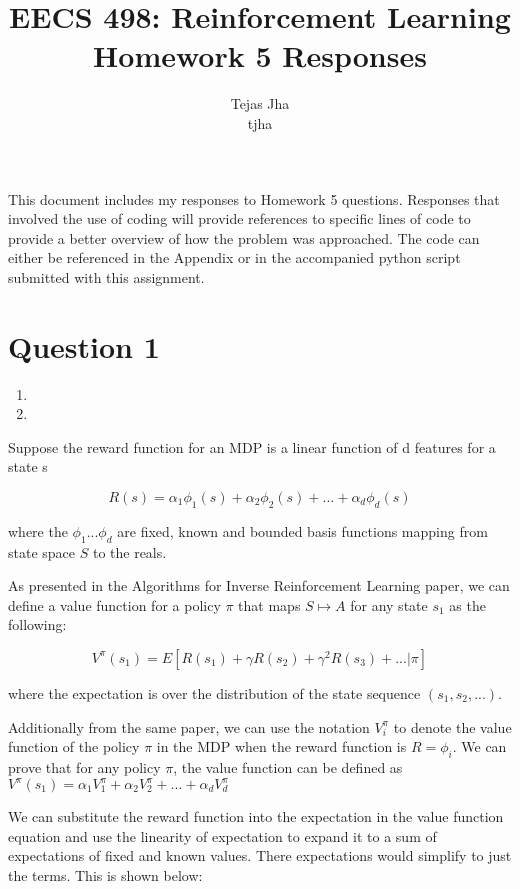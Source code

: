 \documentclass[11pt]{article}
\title{EECS 498: Reinforcement Learning \protect \\ Homework 5 Responses}
\author{Tejas Jha \\ tjha}
\begin{document}
\maketitle
This document includes my responses to Homework 5 questions. Responses that involved the use of coding will provide references to specific lines of code to provide a better overview of how the problem was approached. The code can either be referenced in the Appendix or in the accompanied python script submitted with this assignment.

\section*{Question 1}
\begin{enumerate}[label=(\alph*)]
\item


\item

\end{enumerate}
Suppose the reward function for an MDP is a linear function of d features for a state s

$$R(s) = \alpha_{1}\phi_{1}(s) + \alpha_{2}\phi_{2}(s) + ... +  \alpha_{d}\phi_{d}(s)$$

where the $\phi_{1} ... \phi_{d}$ are fixed, known and bounded basis functions mapping from state space $S$ to the reals. 

As presented in the Algorithms for Inverse Reinforcement Learning paper, we can define a value function for a policy $\pi$ that maps $S \mapsto A$  for any state $s_{1}$ as the following:

$$V^{\pi}(s_{1}) = E[R(s_{1}) + \gamma R(s_{2}) + \gamma^{2} R(s_{3}) + ... | \pi]$$

where the expectation is over the distribution of the state sequence $(s_{1}, s_{2}, ...)$.

Additionally from the same paper, we can use the notation $V_{i}^{\pi}$ to denote the value function of the policy $\pi$ in the MDP when the reward function is $R = \phi_{i}$. We can prove that for any policy $\pi$, the value function can be defined as $V^{\pi}(s_{1}) = \alpha_{1} V_{1}^{\pi} + \alpha_{2} V_{2}^{\pi} + ... + \alpha_{d} V_{d}^{\pi}$

We can substitute the reward function into the expectation in the value function equation and use the linearity of expectation to expand it to a sum of expectations of fixed and known values. There expectations would simplify to just the terms. This is shown below:
\end{document}
